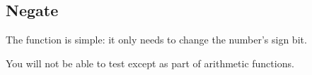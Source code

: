 \subsection{Negate}

The  function is simple: it only needs to change the number's sign bit.

\begin{description}
\end{description}

You will not be able to test  except as part of arithmetic functions.
